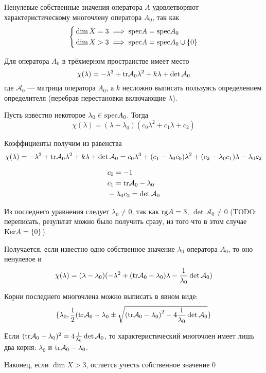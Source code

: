 Ненулевые собственные значения оператора $A$
удовлетворяют характеристическому многочлену оператора $A_0$,
так как
$$\left\{\begin{aligned}
& \dim X = 3 \implies \mathrm{spec} A = \mathrm{spec} A_0 \\
& \dim X > 3 \implies \mathrm{spec} A = \mathrm{spec} A_0 \cup \{0\}
\end{aligned}\right.$$

Для оператора $A_0$ в трёхмерном пространстве имеет место
$$\chi(\lambda) = -\lambda^3 + \mathrm{tr}\mathcal A_0 \lambda^2 + k\lambda + \det\mathcal A_0$$
где $\mathcal A_0$ --- матрица оператора $A_0$,
а $k$ несложно выписать пользуясь определением определителя (перебрав перестановки включающие $\lambda$).

Пусть известно некоторое
$\lambda_0\in\mathrm{spec} A_0$.
Тогда
$$\chi(\lambda) = (\lambda - \lambda_0) (c_0\lambda^2 + c_1\lambda + c_2)$$

Коэффициенты получим из равенства
$$\chi(\lambda) = -\lambda^3 + \mathrm{tr}\mathcal A_0 \lambda^2 + k\lambda + \det\mathcal A_0
  = c_0\lambda^3 + (c_1 - \lambda_0 c_0)\lambda^2 + (c_2 - \lambda_0 c_1)\lambda - \lambda_0 c_2$$

\begin{align*}
& c_0 = -1 \\
& c_1 = \mathrm{tr}\mathcal A_0 - \lambda_0 \\
& -\lambda_0 c_2 = \det\mathcal A_0
\end{align*}

Из последнего уравнения следует $\lambda_0\neq 0$,
так как $\mathrm{rg} A = 3$, $\det\mathcal A_0 \neq 0$
(TODO: переписать, результат можно было получить сразу, из того что в этом случае $\mathrm{Ker} A = \{0\}$).

Получается, если известно одно собственное значение $\lambda_0$ оператора $A_0$,
то оно ненулевое и
$$\chi(\lambda) = (\lambda - \lambda_0) (-\lambda^2 + (\mathrm{tr}\mathcal A_0 - \lambda_0)\lambda - \frac{1}{\lambda_0}\det\mathcal A_0)$$

Корни последнего многочлена можно выписать в явном виде:
$$\{\lambda_0,
     \frac{1}{2} (\mathrm{tr}\mathcal A_0 - \lambda_0
     \pm\sqrt{ {(\mathrm{tr}\mathcal A_0 - \lambda_0)}^2 - 4\frac{1}{\lambda_0} \det\mathcal A_0 }
  \}$$

Если
 $(\mathrm{tr}\mathcal A_0 - \lambda_0)^2 = 4\frac{1}{\lambda_0}\det\mathcal A_0$,
то характеристический многочлен имеет лишь два корня: $\lambda_0$ и $\mathrm{tr}\mathcal A_0 - \lambda_0$.

Наконец, если $\dim X > 3$, остается учесть собственное значение $0$


